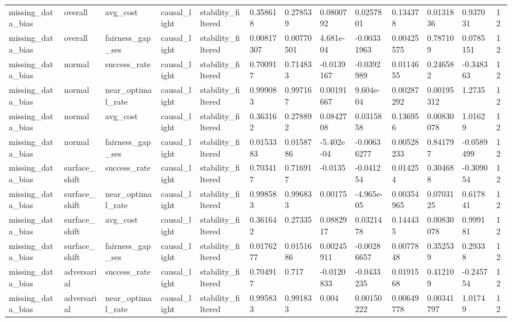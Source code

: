 \begin{tabular}{lllllllllllll}
missing\_data\_bias & overall & avg\_cost & causal\_light & stability\_filtered & 0.358618 & 0.278539 & 0.0800792 & 0.0257801 & 0.134378 & 0.0131836 & 0.937031 & 12 \\
missing\_data\_bias & overall & fairness\_gap\_ses & causal\_light & stability\_filtered & 0.00817307 & 0.00770501 & 4.681e-04 & -0.00331963 & 0.00425575 & 0.787109 & 0.0785151 & 12 \\
missing\_data\_bias & normal & success\_rate & causal\_light & stability\_filtered & 0.700917 & 0.714833 & -0.0139167 & -0.0392989 & 0.0114655 & 0.246582 & -0.348363 & 12 \\
missing\_data\_bias & normal & near\_optimal\_rate & causal\_light & stability\_filtered & 0.999083 & 0.997167 & 0.00191667 & 9.604e-04 & 0.00287292 & 0.00195312 & 1.2735 & 12 \\
missing\_data\_bias & normal & avg\_cost & causal\_light & stability\_filtered & 0.363162 & 0.278892 & 0.0842708 & 0.0315858 & 0.136956 & 0.00830078 & 1.01629 & 12 \\
missing\_data\_bias & normal & fairness\_gap\_ses & causal\_light & stability\_filtered & 0.0153383 & 0.0158786 & -5.402e-04 & -0.00636277 & 0.00528233 & 0.841797 & -0.0589499 & 12 \\
missing\_data\_bias & surface\_shift & success\_rate & causal\_light & stability\_filtered & 0.703417 & 0.716917 & -0.0135 & -0.041254 & 0.014254 & 0.304688 & -0.309054 & 12 \\
missing\_data\_bias & surface\_shift & near\_optimal\_rate & causal\_light & stability\_filtered & 0.998583 & 0.996833 & 0.00175 & -4.965e-05 & 0.00354965 & 0.0703125 & 0.617841 & 12 \\
missing\_data\_bias & surface\_shift & avg\_cost & causal\_light & stability\_filtered & 0.361642 & 0.27335 & 0.0882917 & 0.0321478 & 0.144435 & 0.00830078 & 0.999181 & 12 \\
missing\_data\_bias & surface\_shift & fairness\_gap\_ses & causal\_light & stability\_filtered & 0.0176277 & 0.0151686 & 0.00245911 & -0.00286657 & 0.0077848 & 0.352539 & 0.29338 & 12 \\
missing\_data\_bias & adversarial & success\_rate & causal\_light & stability\_filtered & 0.704917 & 0.717 & -0.0120833 & -0.0433235 & 0.0191568 & 0.412109 & -0.245754 & 12 \\
missing\_data\_bias & adversarial & near\_optimal\_rate & causal\_light & stability\_filtered & 0.995833 & 0.991833 & 0.004 & 0.00150222 & 0.00649778 & 0.00341797 & 1.01749 & 12 \\

\end{tabular}
